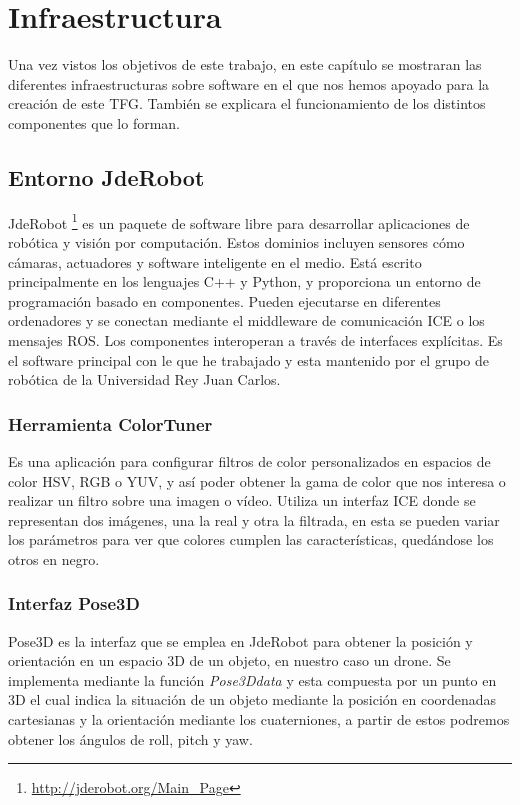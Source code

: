\chapter{Infraestructura}\label{cap.infraestructura}
\hspace{1cm} Una vez vistos los objetivos de este trabajo, en este capítulo se mostraran las diferentes infraestructuras sobre software en el que nos hemos apoyado para la creación de este TFG. También se explicara el funcionamiento de los distintos componentes que lo forman.

\section{Entorno JdeRobot}
\hspace{1cm} JdeRobot \footnote{\url{http://jderobot.org/Main_Page}} es un paquete de software libre para desarrollar aplicaciones de robótica y visión por computación. Estos dominios incluyen sensores cómo cámaras, actuadores y software inteligente en el medio. Está escrito principalmente en los lenguajes C++ y Python, y proporciona un entorno de programación basado en componentes. Pueden ejecutarse en diferentes ordenadores y se conectan mediante el middleware de comunicación ICE o los mensajes ROS. Los componentes interoperan a través de interfaces explícitas. Es el software principal con le que he trabajado y esta mantenido por el grupo de robótica de la Universidad Rey Juan Carlos.

\subsection{Herramienta ColorTuner}
\hspace{1cm} Es una aplicación para configurar filtros de color personalizados en espacios de color HSV, RGB o YUV, y así poder obtener la gama de color que nos interesa o realizar un filtro sobre una imagen o vídeo. Utiliza un interfaz ICE donde se representan dos imágenes, una la real y otra la filtrada, en esta se pueden variar los parámetros para ver que colores cumplen las características, quedándose los otros en negro.

\subsection{Interfaz Pose3D}
\hspace{1cm} Pose3D es la interfaz que se emplea en JdeRobot para obtener la posición y orientación en un espacio 3D de un objeto, en nuestro caso un drone. Se implementa mediante la función \emph{Pose3Ddata} y esta compuesta por un punto en 3D el cual indica la situación de un objeto mediante la posición en coordenadas cartesianas y la orientación mediante los cuaterniones, a partir de estos podremos obtener los ángulos de roll, pitch y yaw.

